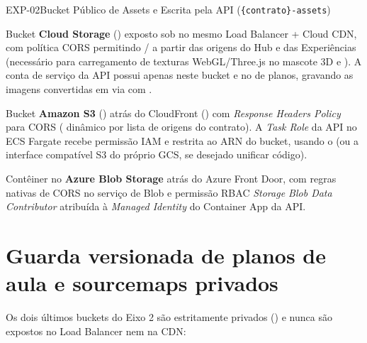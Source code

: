 \begin{pecaarq}{EXP-02}{Bucket Público de Assets e Escrita pela API (\texttt{\{contrato\}-assets})}{\sgcp~\nativo\enspace\saws~\nativo\enspace\sazure~\nativo}
\begin{campos}
  \item[Como é hoje (GCP)] Bucket \textbf{Cloud Storage}
    () exposto sob  no mesmo Load
    Balancer + Cloud CDN, com política CORS permitindo / a
    partir das origens do Hub e das Experiências (necessário para carregamento
    de texturas WebGL/Three.js no mascote 3D e ). A conta de
    serviço da API possui  apenas neste bucket e
    no de planos, gravando as imagens convertidas em  via 
    com .
  \item[Equivalente AWS] Bucket \textbf{Amazon S3} ()
    atrás do CloudFront () com \emph{Response Headers Policy}
    para CORS ( dinâmico por lista de origens
    do contrato). A \emph{Task Role} da API no ECS Fargate recebe permissão IAM
     e  restrita ao ARN do bucket, usando o
     (ou a interface compatível S3 do próprio GCS, se
    desejado unificar código).
  \item[Equivalente Azure] Contêiner  no \textbf{Azure Blob Storage}
    atrás do Azure Front Door, com regras nativas de CORS no serviço de Blob e
    permissão RBAC \emph{Storage Blob Data Contributor} atribuída à
    \emph{Managed Identity} do Container App da API.
\end{campos}
\end{pecaarq}

\section{Guarda versionada de planos de aula e sourcemaps privados}

Os dois últimos buckets do Eixo 2 são estritamente privados () e nunca são expostos no Load Balancer nem na CDN:

